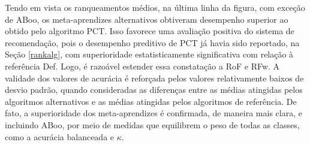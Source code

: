 % 

Tendo em vista os ranqueamentos médios, na última linha da figura, com exceção de ABoo, os meta-aprendizes alternativos obtiveram desempenho superior ao obtido pelo algoritmo PCT.
Isso favorece uma avaliação positiva do sistema de recomendação, pois o desempenho preditivo de PCT já havia sido reportado, na Seção \ref{rankalg}, com superioridade estatisticamente significativa com relação à referência Def.
Logo, é razoável estender essa constatação a RoF e RFw.
A validade dos valores de acurácia é reforçada pelos valores relativamente baixos de desvio padrão, quando consideradas as diferenças entre as médias atingidas pelos algoritmos alternativos e as médias atingidas pelos algoritmos de referência.
De fato, a superioridade dos meta-aprendizes é confirmada, de maneira mais clara, e incluindo ABoo, por meio de medidas que equilibrem o peso de todas as classes, como a acurácia balanceada e $\kappa$.

